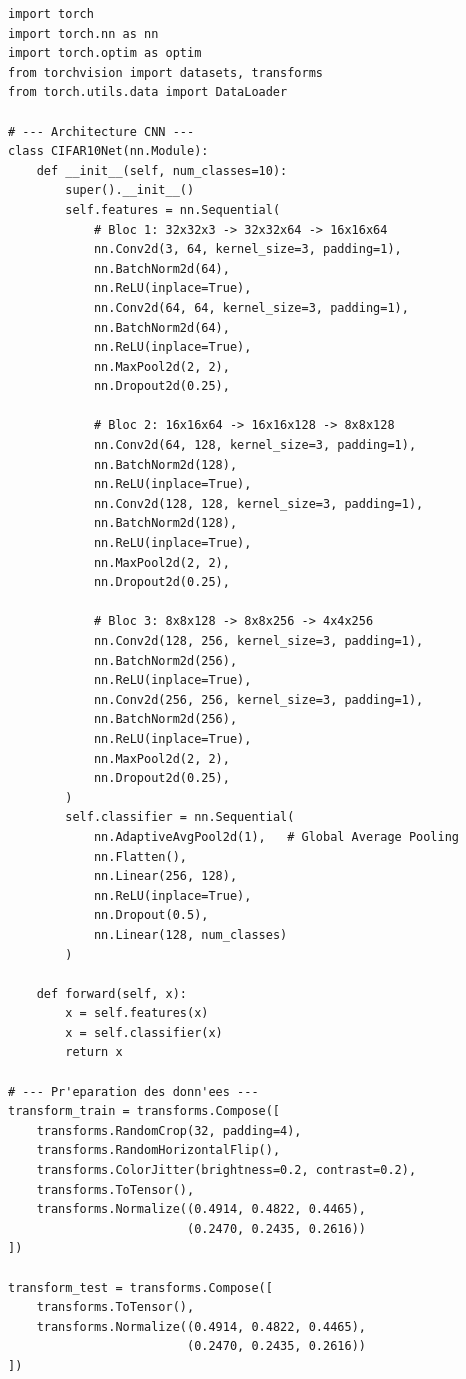 \begin{codeblock}[title=\textbf{CNN pour CIFAR-10 avec entra\^inement complet}]
\begin{verbatim}
import torch
import torch.nn as nn
import torch.optim as optim
from torchvision import datasets, transforms
from torch.utils.data import DataLoader

# --- Architecture CNN ---
class CIFAR10Net(nn.Module):
    def __init__(self, num_classes=10):
        super().__init__()
        self.features = nn.Sequential(
            # Bloc 1: 32x32x3 -> 32x32x64 -> 16x16x64
            nn.Conv2d(3, 64, kernel_size=3, padding=1),
            nn.BatchNorm2d(64),
            nn.ReLU(inplace=True),
            nn.Conv2d(64, 64, kernel_size=3, padding=1),
            nn.BatchNorm2d(64),
            nn.ReLU(inplace=True),
            nn.MaxPool2d(2, 2),
            nn.Dropout2d(0.25),

            # Bloc 2: 16x16x64 -> 16x16x128 -> 8x8x128
            nn.Conv2d(64, 128, kernel_size=3, padding=1),
            nn.BatchNorm2d(128),
            nn.ReLU(inplace=True),
            nn.Conv2d(128, 128, kernel_size=3, padding=1),
            nn.BatchNorm2d(128),
            nn.ReLU(inplace=True),
            nn.MaxPool2d(2, 2),
            nn.Dropout2d(0.25),

            # Bloc 3: 8x8x128 -> 8x8x256 -> 4x4x256
            nn.Conv2d(128, 256, kernel_size=3, padding=1),
            nn.BatchNorm2d(256),
            nn.ReLU(inplace=True),
            nn.Conv2d(256, 256, kernel_size=3, padding=1),
            nn.BatchNorm2d(256),
            nn.ReLU(inplace=True),
            nn.MaxPool2d(2, 2),
            nn.Dropout2d(0.25),
        )
        self.classifier = nn.Sequential(
            nn.AdaptiveAvgPool2d(1),   # Global Average Pooling
            nn.Flatten(),
            nn.Linear(256, 128),
            nn.ReLU(inplace=True),
            nn.Dropout(0.5),
            nn.Linear(128, num_classes)
        )

    def forward(self, x):
        x = self.features(x)
        x = self.classifier(x)
        return x

# --- Pr'eparation des donn'ees ---
transform_train = transforms.Compose([
    transforms.RandomCrop(32, padding=4),
    transforms.RandomHorizontalFlip(),
    transforms.ColorJitter(brightness=0.2, contrast=0.2),
    transforms.ToTensor(),
    transforms.Normalize((0.4914, 0.4822, 0.4465),
                         (0.2470, 0.2435, 0.2616))
])

transform_test = transforms.Compose([
    transforms.ToTensor(),
    transforms.Normalize((0.4914, 0.4822, 0.4465),
                         (0.2470, 0.2435, 0.2616))
])


\end{verbatim}
\end{codeblock}
